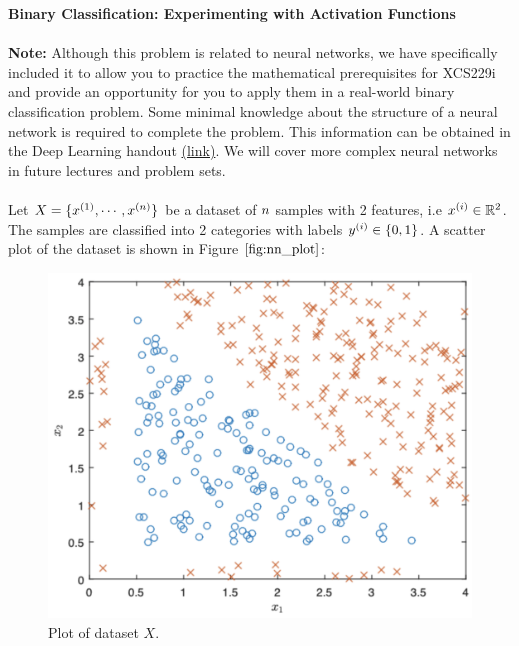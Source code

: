 \item {} {\bf Binary Classification: Experimenting with Activation Functions}\\~\\
\textbf{Note: }Although this problem is related to neural networks, we have specifically included it to allow you to practice the mathematical prerequisites for XCS229i and provide an opportunity for you to apply them in a real-world binary classification problem. Some minimal knowledge about the structure of a neural network is required to complete the problem. This information can be obtained in the Deep Learning handout \href{https://stanford.box.com/s/6qdftyrji89js0uvg4ec23jfmj21xemd}{(link)}. We will cover more complex neural networks in future lectures and problem sets.
\\~\\

Let $X = \{x^{(1)}, \cdots, x^{({n})}\}$ be a dataset of ${n}$ samples with 2 features, i.e $x^{(i)} \in \mathbb{R}^2$. The samples are classified into 2 categories with labels $y^{(i)} \in \{0, 1\}$. A scatter plot of the dataset is shown in Figure $\ref{fig:nn_plot}$:
\begin{figure}[htbp]
    \centering
    \includegraphics[scale=0.3]{simple_nn/nn_plot.png}
    \caption{Plot of dataset $X$.}
    \label{fig:nn_plot}
\end{figure}

